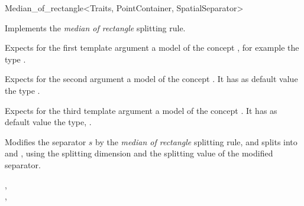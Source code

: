 
\begin{ccRefFunctionObjectClass}{Median_of_rectangle<Traits, PointContainer, SpatialSeparator>}

\ccDefinition
Implements the {\em median of rectangle} splitting rule.

\ccParameters

Expects for the first template argument a model of
the concept , for example
the type .

Expects for the second argument a model of the concept . It has as default value
the type .

Expects for the third template argument a model of the concept . It has as default value
the type, .


\ccIsModel


\ccTypes



\ccOperations

{Modifies the separator $s$ by the {\em median of rectangle} splitting rule, 
and splits  into  and ,
using the splitting dimension and the splitting value of the modified separator.
}

\ccSeeAlso

,\\
,\\

\end{ccRefFunctionObjectClass}




